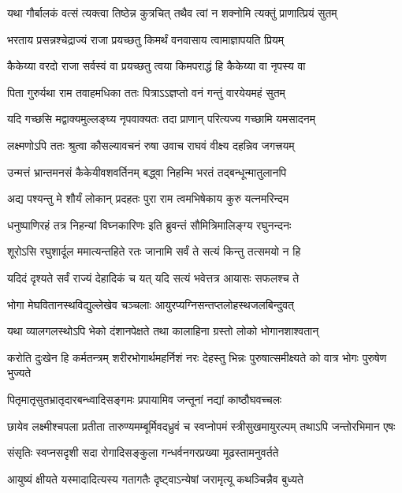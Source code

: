 \twolineshloka
{यथा गौर्बालकं वत्सं त्यक्त्वा तिष्ठेन्न कुत्रचित्}
{तथैव त्वां न शक्नोमि त्यक्तुं प्राणात्प्रियं सुतम्} %

\twolineshloka
{भरताय प्रसन्नश्चेद्राज्यं राजा प्रयच्छतु}
{किमर्थं वनवासाय त्वामाज्ञापयति प्रियम्} %

\twolineshloka
{कैकेय्या वरदो राजा सर्वस्वं वा प्रयच्छतु}
{त्वया किमपराद्धं हि कैकेय्या वा नृपस्य वा} %

\twolineshloka
{पिता गुरुर्यथा राम तवाहमधिका ततः}
{पित्राऽऽज्ञप्तो वनं गन्तुं वारयेयमहं सुतम्} %

\twolineshloka
{यदि गच्छसि मद्वाक्यमुल्लङ्घ्य नृपवाक्यतः}
{तदा प्राणान् परित्यज्य गच्छामि यमसादनम्} %

\twolineshloka
{लक्ष्मणोऽपि ततः श्रुत्वा कौसल्यावचनं रुषा}
{उवाच राघवं वीक्ष्य दहन्निव जगत्त्रयम्} %

\twolineshloka
{उन्मत्तं भ्रान्तमनसं कैकेयीवशवर्तिनम्}
{बद्ध्वा निहन्मि भरतं तद्बन्धून्मातुलानपि} %

\twolineshloka
{अद्य पश्यन्तु मे शौर्यं लोकान् प्रदहतः पुरा}
{राम त्वमभिषेकाय कुरु यत्नमरिन्दम} %

\twolineshloka
{धनुष्पाणिरहं तत्र निहन्यां विघ्नकारिणः}
{इति ब्रुवन्तं सौमित्रिमालिङ्ग्य रघुनन्दनः} %

\twolineshloka
{शूरोऽसि रघुशार्दूल ममात्यन्तहिते रतः}
{जानामि सर्वं ते सत्यं किन्तु तत्समयो न हि} %

\twolineshloka
{यदिदं दृश्यते सर्वं राज्यं देहादिकं च यत्}
{यदि सत्यं भवेत्तत्र आयासः सफलश्च ते} %

\twolineshloka
{भोगा मेघवितानस्थविद्युल्लेखेव चञ्चलाः}
{आयुरप्यग्निसन्तप्तलोहस्थजलबिन्दुवत्} %

\twolineshloka
{यथा व्यालगलस्थोऽपि भेको दंशानपेक्षते}
{तथा कालाहिना ग्रस्तो लोको भोगानशाश्वतान्} %

\fourlineindentedshloka
{करोति दुःखेन हि कर्मतन्त्रम्}
{शरीरभोगार्थमहर्निशं नरः}
{देहस्तु भिन्नः पुरुषात्समीक्ष्यते}
{को वात्र भोगः पुरुषेण भुज्यते} %

\twolineshloka
{पितृमातृसुतभ्रातृदारबन्ध्वादिसङ्गमः}
{प्रपायामिव जन्तूनां नद्यां काष्ठौघवच्चलः} %

\fourlineindentedshloka
{छायेव लक्ष्मीश्चपला प्रतीता}
{तारुण्यमम्बूर्मिवदध्रुवं च}
{स्वप्नोपमं स्त्रीसुखमायुरल्पम्}
{तथाऽपि जन्तोरभिमान एषः} %

\twolineshloka
{संसृतिः स्वप्नसदृशी सदा रोगादिसङ्कुला}
{गन्धर्वनगरप्रख्या मूढस्तामनुवर्तते} %

\twolineshloka
{आयुष्यं क्षीयते यस्मादादित्यस्य गतागतैः}
{दृष्ट्वाऽन्येषां जरामृत्यू कथञ्चिन्नैव बुध्यते} %

